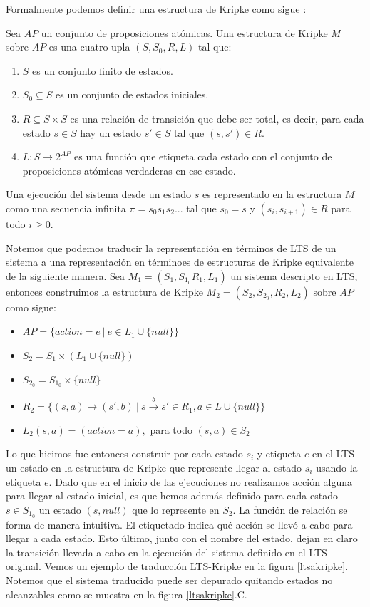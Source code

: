 \documentclass[titlepage, 12pt]{book}
\begin{document}
Formalmente podemos definir una estructura de Kripke como sigue \cite{Clarke}:

Sea $AP$ un conjunto de proposiciones at\'omicas. Una estructura de Kripke $M$ sobre $AP$ es una cuatro-upla $(S,S_0,R,L)$ tal que:

\begin{enumerate}
\item $S$ es un conjunto finito de estados.
\item $S_0 \subseteq S$ es un conjunto de estados iniciales.
\item $R \subseteq S \times S$ es una relaci\'on de transici\'on que debe ser total, es decir, para cada estado $s \in S$ hay un estado $s' \in S$ tal que $(s,s') \in R$.
\item $L : S \rightarrow 2^{AP}$ es una funci\'on que etiqueta cada estado con el conjunto de proposiciones at\'omicas verdaderas en ese estado.
\end{enumerate}

Una ejecuci\'on del sistema desde un estado $s$ es representado en la estructura $M$ como una secuencia infinita $\pi = s_0s_1s_2...$ tal que $s_0 = s$ y $(s_i,s_{i+1})\in R$ para todo $i \geq 0$.

Notemos que podemos traducir la representaci\'on en t\'erminos de LTS de un sistema a una representaci\'on en t\'erminoes de estructuras de Kripke equivalente de la siguiente manera. Sea $M_1 = (S_1, S_{1_0} R_1, L_1)$ un sistema descripto en LTS, entonces construimos la estructura de Kripke $M_2 = (S_2,S_{2_0},R_2,L_2)$ sobre $AP$ como sigue:
\begin{itemize}
\item $ AP = \{action = e ~|~ e \in L_1 \cup \{null\}\} $
\item $ S_2 = S_1 \times (L_1 \cup \{null\}) $
\item $S_{2_0} = S_{1_0} \times \{null\}$
\item $R_2 = \{(s,a) \rightarrow (s',b) ~|~ s\overset{b}{\rightarrow}s' \in R_1, a \in L \cup \{null\}\}$
\item $L_2(s,a) = (action = a),$ para todo $(s,a) \in S_2$
\end{itemize}
Lo que hicimos fue entonces construir por cada estado $s_i$ y etiqueta $e$ en el LTS un estado en la estructura de Kripke que represente llegar al estado $s_i$ usando la etiqueta $e$. Dado que en el inicio de las ejecuciones no realizamos acci\'on alguna para llegar al estado inicial, es que hemos adem\'as definido para cada estado $s \in S_{1_0}$ un estado $(s,null)$ que lo represente en $S_2$. La funci\'on de relaci\'on se forma de manera intuitiva. El etiquetado indica qu\'e acci\'on se llev\'o a cabo para llegar a cada estado. Esto \'ultimo, junto con el nombre del estado, dejan en claro la transici\'on llevada a cabo en la ejecuci\'on del sistema definido en el LTS original. Vemos un ejemplo de traducci\'on LTS-Kripke en la figura \ref{ltsakripke}. Notemos que el sistema traducido puede ser depurado quitando estados no alcanzables como se muestra en la figura \ref{ltsakripke}.C.
\end{document}
